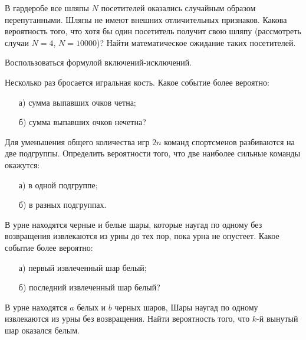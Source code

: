 \begin{problem}
В гардеробе все шляпы $N$ посетителей оказались случайным образом перепутанными. Шляпы не имеют внешних отличительных признаков. 
Какова вероятность того, что хотя бы один посетитель получит свою шляпу (рассмотреть случаи $N=4$, $N=10000$)? Найти математическое ожидание таких посетителей. 

\begin{ordre}
Воспользоваться формулой включений-исключений.
\end{ordre}

\end{problem}


\begin{problem}
Несколько раз бросается игральная кость. Какое событие более вероятно: 
\begin{enumerate}
\item[а)] сумма выпавших очков четна; 
\item[б)] сумма выпавших очков нечетна? 
\end{enumerate}
\end{problem}


\begin{problem}
Для уменьшения общего количества игр $2n$ команд спортсменов разбиваются на две подгруппы. Определить вероятности того, что 
две наиболее сильные команды окажутся: 
\begin{enumerate}
\item[а)] в одной подгруппе; 
\item[б)] в разных подгруппах. 
\end{enumerate}
\end{problem}


\begin{problem}
В урне находятся черные и белые шары, которые наугад по одному без возвращения извлекаются из урны до тех пор, пока урна не опустеет. 
Какое событие более вероятно: 
\begin{enumerate}
\item[а)] первый извлеченный шар белый; 
\item[б)] последний извлеченный шар белый? 
\end{enumerate}
\end{problem}



\begin{problem}
В урне находятся $a$ белых и $b$ черных шаров, Шары наугад по одному извлекаются из урны без возвращения. Найти вероятность того, 
что $k$-й вынутый шар оказался белым. 
\end{problem}


